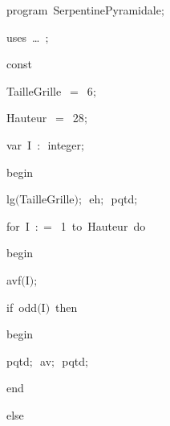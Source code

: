 
{
\parindent {}
\medskip

\carrenoir
\vspace{\neglskip}\mbox{\blc  \idt  \mcl program\idt\ SerpentinePyramidale$;$
}\par 
\vspace{\neglskip}\mbox{\blc \blk\idt \mcl uses\idt \ \ldots\ $;$
}\par 
\pagebreak[3] 
\vspace{\neglskip}\mbox{\blc  \blk\idt  \mcl const\idt }\par 
\vspace{\neglskip}\mbox{\blc  \blk\blk\idt  TailleGrille\ $=$\ 6$;$}\par 
\vspace{\neglskip}\mbox{\blc  \blk\blk\idt  Hauteur\ $=$\ 28$;$}\par 
\pagebreak[3] 
\vspace{\neglskip}\mbox{\blc  \blk\idt  \mcl var\idt \ I\ $:$\ integer$;$}\par 
\vspace{\neglskip}\mbox{\blc  \idt  \mcl begin\idt }\par 
\vspace{\neglskip}\mbox{\blc  \blk\idt  lg$($TailleGrille$)$$;$\ eh$;$\ pqtd$;$\ }\par 
\pagebreak[3] 
\vspace{\neglskip}\mbox{\blc  \blk\idt  \mcl for\idt \ I\ $:$$=$\ 1\ \mcl to\idt \ Hauteur\ \mcl do\idt }\par 
\vspace{\neglskip}\mbox{\blc  \blk\blk\idt  \mcl begin\idt }\par 
\vspace{\neglskip}\mbox{\blc  \blk\blk\blk\idt  avf$($I$)$$;$}\par 
\pagebreak[3] 
\vspace{\neglskip}\mbox{\blc  \blk\blk\blk\idt  \mcl if\idt \ odd$($I$)$\ \mcl then\idt }\par 
\vspace{\neglskip}\mbox{\blc  \blk\blk\blk\blk\idt  \mcl begin\idt }\par 
\vspace{\neglskip}\mbox{\blc  \blk\blk\blk\blk\blk\idt  pqtd$;$\ av$;$\ pqtd$;$\ }\par 
\vspace{\neglskip}\mbox{\blc  \blk\blk\blk\blk\idt  \mcl end\idt }\par 
\pagebreak[3] 
\vspace{\neglskip}\mbox{\blc  \blk\blk\blk\idt  \mcl else\idt }\par 
}
